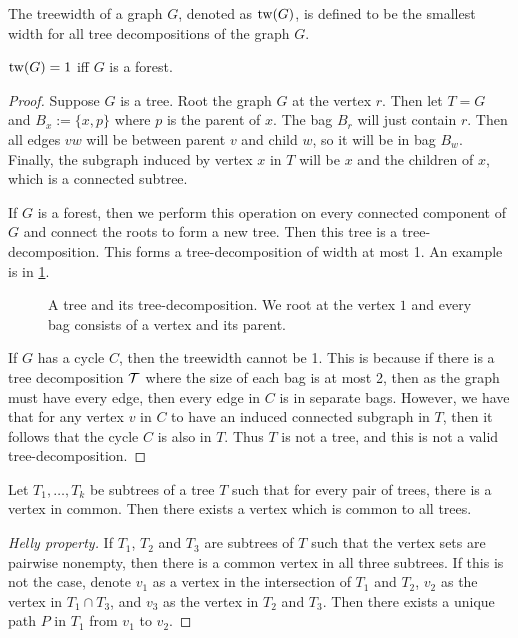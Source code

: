 \begin{definition}\label{def:treewidth}
	The treewidth of a graph \(G\), denoted as \(\operatorname{tw}(G)\), is defined to be the smallest width for all tree decompositions of the graph \(G\).
\end{definition}


\begin{example}\label{ex:treewidth_forest}
	\(\operatorname{tw}(G) = 1\) iff \(G\) is a forest.
	\begin{proof}
		Suppose \(G\) is a tree. Root the graph \(G\) at the vertex \(r\). Then let \(T = G\) and \(B_x:= \lbrace x, p \rbrace\) where \(p\) is the parent of \(x\). The bag \(B_r\) will just contain \(r\). Then all edges \(vw\) will be between parent \(v\) and child \(w\), so it will be in bag \(B_w\). Finally, the subgraph induced by vertex \(x\) in \(T\) will be \(x\) and the children of \(x\), which is a connected subtree.
		
		If \(G\) is a forest, then we perform this operation on every connected component of \(G\) and connect the roots to form a new tree. Then this tree is a tree-decomposition. This forms a tree-decomposition of width at most 1. An example is in \cref{fig:tree-treedecomp}. 
		\begin{figure}[ht]
			\centering
			
			
			\caption{A tree and its tree-decomposition. We root at the vertex \(1\) and every bag consists of a vertex and its parent.}
			\label{fig:tree-treedecomp}
		\end{figure}
		If \(G\) has a cycle \(C\), then the treewidth cannot be 1. This is because if there is a tree decomposition \(\mathcal{T}\) where the size of each bag is at most 2, then as the graph must have every edge, then every edge in \(C\) is in separate bags. However, we have that for any vertex \(v\) in \(C\) to have an induced connected subgraph in \(T\), then it follows that the cycle \(C\) is also in \(T\). Thus \(T\) is not a tree, and this is not a valid tree-decomposition. 
	\end{proof}
\end{example}

\begin{lemma}\label{lem:Helly}
	Let \(T_1, \ldots, T_k\) be subtrees of a tree \(T\) such that for every pair of trees, there is a vertex in common. Then there exists a vertex which is common to all trees.
\end{lemma}
\begin{proof}[Helly property]
	If \(T_1\), \(T_2\) and \(T_3\) are subtrees of \(T\) such that the vertex sets are pairwise nonempty, then there is a common vertex in all three subtrees. If this is not the case, denote \(v_1\) as a vertex in the intersection of \(T_1\) and \(T_2\), \(v_2\) as the vertex in \(T_1 \cap T_3\), and \(v_3\) as the vertex in \(T_2\) and \(T_3\). Then there exists a unique path \(P\) in \(T_1\) from \(v_1\) to \(v_2\).
\end{proof}

